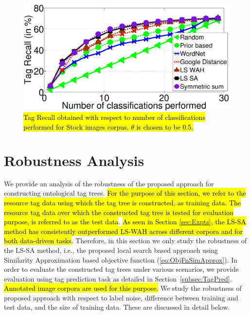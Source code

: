 \begin{figure}[!htp]
\centering
\includegraphics[width=0.65\linewidth]{TagTree/Rebuttal_FastTP_GWS}
\caption{\hl{Tag Recall obtained with respect to number of classifications performed for Stock images corpus. $\theta$ is chosen to  be 0.5. }}  
\label{fig:EfficientTagPredGraphGetty}
\end{figure}

\section{Robustness Analysis} \label{sec:Robustness}
We provide an analysis of the robustness of the proposed approach for constructing ontological tag trees. \hl{For the purpose of this section, we refer to the resource tag data using which the tag tree is constructed, as training data. The resource tag data over which the constructed tag tree is tested for evaluation purpose, is referred to as the test data}. \hl{As seen in Section {\ref{sec:Expts}}, the LS-SA method has consistently outperformed LS-WAH across different corpora and for both data-driven tasks}. Therefore, in this section we only study the robustness of the LS-SA method, i.e., the proposed local search based approach using Similarity Approximation based objective function (\ref{eq:ObjFnSimApprox}). In order to evaluate the constructed tag trees under various scenarios, we provide evaluation using tag prediction task as detailed in Section~\ref{subsec:TagPred}. \hl{Annotated image corpora are used for this purpose.} We study the robustness of proposed approach with respect to label noise, difference between training and test data, and the size of training data. These are discussed in detail below. 
